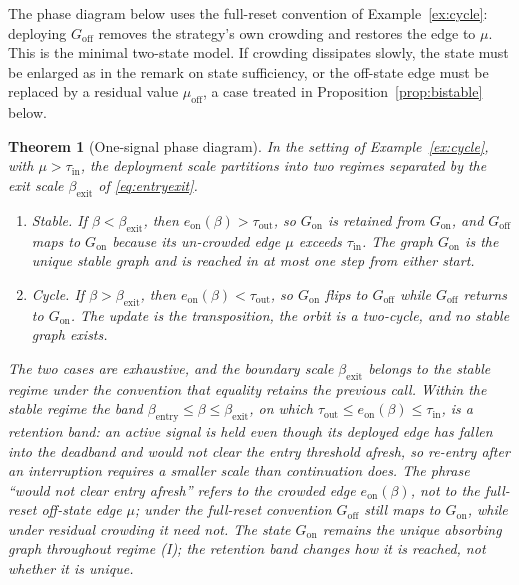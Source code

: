 \documentclass[11pt]{article}
\theoremstyle{plain}
\newtheorem{theorem}{Theorem}
\theoremstyle{definition}
\begin{document}
The phase diagram below uses the full-reset convention of Example~\ref{ex:cycle}: deploying $G_{\mathrm{off}}$ removes the strategy's own crowding and restores the edge to $\mu$. This is the minimal two-state model. If crowding dissipates slowly, the state must be enlarged as in the remark on state sufficiency, or the off-state edge must be replaced by a residual value $\mu_{\mathrm{off}}$, a case treated in Proposition~\ref{prop:bistable} below.

\begin{theorem}[One-signal phase diagram]\label{thm:dichotomy}
In the setting of Example~\ref{ex:cycle}, with $\mu>\tau_{\mathrm{in}}$, the deployment scale partitions into two regimes separated by the exit scale $\beta_{\mathrm{exit}}$ of \eqref{eq:entryexit}.
\begin{enumerate}
\item[(I)] \emph{Stable.} If $\beta<\beta_{\mathrm{exit}}$, then $e_{\mathrm{on}}(\beta)>\tau_{\mathrm{out}}$, so $G_{\mathrm{on}}$ is retained from $G_{\mathrm{on}}$, and $G_{\mathrm{off}}$ maps to $G_{\mathrm{on}}$ because its un-crowded edge $\mu$ exceeds $\tau_{\mathrm{in}}$. The graph $G_{\mathrm{on}}$ is the unique stable graph and is reached in at most one step from either start.
\item[(II)] \emph{Cycle.} If $\beta>\beta_{\mathrm{exit}}$, then $e_{\mathrm{on}}(\beta)<\tau_{\mathrm{out}}$, so $G_{\mathrm{on}}$ flips to $G_{\mathrm{off}}$ while $G_{\mathrm{off}}$ returns to $G_{\mathrm{on}}$. The update is the transposition, the orbit is a two-cycle, and no stable graph exists.
\end{enumerate}
The two cases are exhaustive, and the boundary scale $\beta_{\mathrm{exit}}$ belongs to the stable regime under the convention that equality retains the previous call. Within the stable regime the band $\beta_{\mathrm{entry}}\le\beta\le\beta_{\mathrm{exit}}$, on which $\tau_{\mathrm{out}}\le e_{\mathrm{on}}(\beta)\le\tau_{\mathrm{in}}$, is a retention band: an active signal is held even though its deployed edge has fallen into the deadband and would not clear the entry threshold afresh, so re-entry after an interruption requires a smaller scale than continuation does. The phrase ``would not clear entry afresh'' refers to the crowded edge $e_{\mathrm{on}}(\beta)$, not to the full-reset off-state edge $\mu$; under the full-reset convention $G_{\mathrm{off}}$ still maps to $G_{\mathrm{on}}$, while under residual crowding it need not. The state $G_{\mathrm{on}}$ remains the unique absorbing graph throughout regime (I); the retention band changes how it is reached, not whether it is unique.
\end{theorem}
\end{document}
